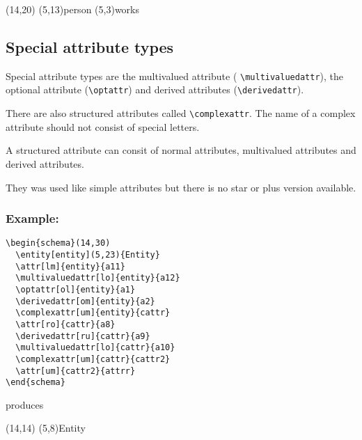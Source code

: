 \documentclass[a4paper,11pt]{article}
\begin{document}
\begin{schema}(14,20)
  \entity[Person](5,13){person}
  \relation[arbeitet](5,3){works}
\end{schema}

\subsection{Special attribute types}

Special attribute types are the multivalued attribute ( \verb|\multivaluedattr|),
the optional attribute (\verb|\optattr|) and derived attributes (\verb|\derivedattr|).

There are also structured attributes called \verb|\complexattr|. 
The name of a complex attribute should not consist of special letters.

A structured attribute can consit of normal attributes, multivalued attributes 
and derived attributes.

They was used like simple attributes but there is no star or plus version available.

\subsubsection*{Example:}

\begin{verbatim}
\begin{schema}(14,30)
  \entity[entity](5,23){Entity}
  \attr[lm]{entity}{a11}
  \multivaluedattr[lo]{entity}{a12}
  \optattr[ol]{entity}{a1}
  \derivedattr[om]{entity}{a2}
  \complexattr[um]{entity}{cattr}
  \attr[ro]{cattr}{a8}
  \derivedattr[ru]{cattr}{a9}
  \multivaluedattr[lo]{cattr}{a10}
  \complexattr[um]{cattr}{cattr2}
  \attr[um]{cattr2}{attrr}
\end{schema}
\end{verbatim}

produces

\begin{schema}(14,14)
  \entity[entity](5,8){Entity}
\end{schema}
\end{document}
